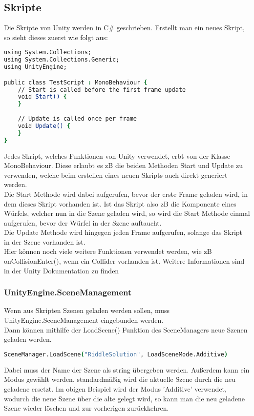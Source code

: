 \subsection{Skripte}
\label{sub:skripte}
Die Skripte von Unity werden in C\# geschrieben. Erstellt man ein neues Skript, so sieht dieses zuerst wie folgt aus:
\begin{lstlisting}[language=csh, caption={Generiertes Unity Skript}]
using System.Collections;
using System.Collections.Generic;
using UnityEngine;

public class TestScript : MonoBehaviour {
    // Start is called before the first frame update
    void Start() {
    }
	
	// Update is called once per frame
    void Update() {
    }
}
\end{lstlisting}
Jedes Skript, welches Funktionen von Unity verwendet, erbt von der Klasse MonoBehaviour.
Diese erlaubt es zB die beiden Methoden Start und Update zu verwenden, welche beim erstellen eines neuen Skripts auch direkt generiert werden.\\
Die Start Methode wird dabei aufgerufen, bevor der erste Frame geladen wird, in dem dieses Skript vorhanden ist. Ist das Skript also zB die Komponente eines Würfels, welcher nun in die Szene geladen wird, so wird die Start Methode einmal aufgerufen, bevor der Würfel in der Szene auftaucht.\\
Die Update Methode wird hingegen jeden Frame aufgerufen, solange das Skript in der Szene vorhanden ist. \\

Hier können noch viele weitere Funktionen verwendet werden, wie zB onCollisionEnter(), wenn ein Collider vorhanden ist. Weitere Informationen sind in der Unity Dokumentation zu finden %

\subsubsection{UnityEngine.SceneManagement}
\label{Grundlagen:SceneManagement}
Wenn aus Skripten Szenen geladen werden sollen, muss UnityEngine.SceneManagement eingebunden werden.\\
Dann können mithilfe der LoadScene() Funktion des SceneManagers neue Szenen geladen werden.
\begin{lstlisting}[language=csh, caption={Laden einer Szene im Skript}]
SceneManager.LoadScene("RiddleSolution", LoadSceneMode.Additive)
\end{lstlisting}
Dabei muss der Name der Szene als string übergeben werden. Außerdem kann ein Modus gewählt werden, standardmäßig wird die aktuelle Szene durch die neu geladene ersetzt. Im obigen Beispiel wird der Modus 'Additive' verwendet, wodurch die neue Szene über die alte gelegt wird, so kann man die neu geladene Szene wieder löschen und zur vorherigen zurückkehren.

